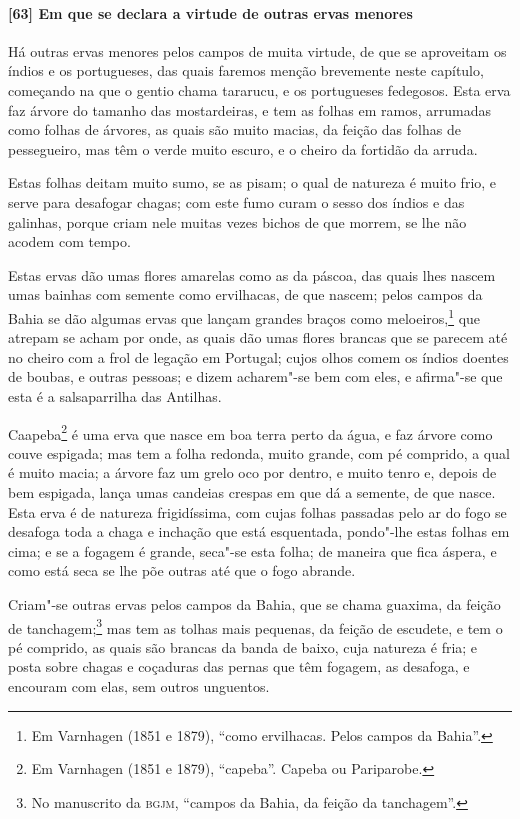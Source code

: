\paragraph{[63] Em que se declara a virtude de outras ervas menores}\quad
Há outras ervas menores pelos campos de muita virtude, de que se aproveitam os índios e os
portugueses, das quais faremos menção brevemente neste capítulo, começando na que o gentio
chama tararucu, e os portugueses fedegosos. Esta erva faz árvore do tamanho das
mostardeiras, e tem as folhas em ramos, arrumadas como folhas de árvores, as quais são
muito macias, da feição das folhas de pessegueiro, mas têm o verde muito escuro, e o
cheiro da fortidão da arruda.

Estas folhas deitam muito sumo, se as pisam; o qual de natureza é muito frio, e serve para
desafogar chagas; com este fumo curam o sesso dos índios e das galinhas, porque criam nele
muitas vezes bichos de que morrem, se lhe não acodem com tempo.

Estas ervas dão umas flores amarelas como as da páscoa, das quais lhes nascem umas bainhas
com semente como ervilhacas, de que nascem; pelos campos da Bahia se dão algumas ervas que
lançam grandes braços como meloeiros,\footnote{ Em Varnhagen (1851 e 1879), ``como
ervilhacas. Pelos campos da Bahia''.} que atrepam se acham por onde, as quais dão umas
flores brancas que se parecem até no cheiro com a frol de legação em Portugal; cujos olhos
comem os índios doentes de boubas, e outras pessoas; e dizem acharem"-se bem com eles, e
afirma"-se que esta é a salsaparrilha das Antilhas.

Caapeba\footnote{ Em Varnhagen (1851 e 1879), ``capeba''. Capeba ou Pariparobe.} é uma
erva que nasce em boa terra perto da água, e faz árvore como couve espigada; mas tem a
folha redonda, muito grande, com pé comprido, a qual é muito macia; a árvore faz um grelo
oco por dentro, e muito tenro e, depois de bem espigada, lança umas candeias crespas em
que dá a semente, de que nasce. Esta erva é de natureza frigidíssima, com cujas folhas
passadas pelo ar do fogo se desafoga toda a chaga e inchação que está esquentada,
pondo"-lhe estas folhas em cima; e se a fogagem é grande, seca"-se esta folha; de maneira
que fica áspera, e como está seca se lhe põe outras até que o fogo abrande.

Criam"-se outras ervas pelos campos da Bahia, que se chama guaxima, da feição de
tanchagem;\footnote{ No manuscrito da \textsc{bgjm}, ``campos da Bahia, da feição da
tanchagem''.} mas tem as tolhas mais pequenas, da feição de escudete, e tem o pé comprido,
as quais são brancas da banda de baixo, cuja natureza é fria; e posta sobre chagas e
coçaduras das pernas que têm fogagem, as desafoga, e encouram com elas, sem outros
unguentos.

